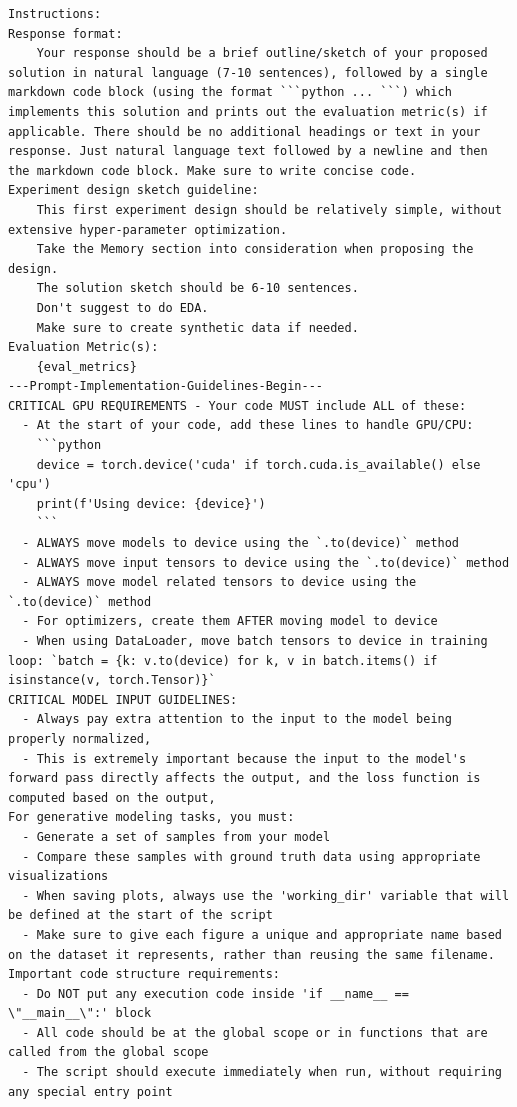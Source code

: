 \begin{appendices}
\begin{tcolorbox}[breakable, colback=orange!5!white, colframe=orange!80!black, title=Initial Experiment Implementation Prompt]
\begin{Verbatim}[breaklines, breaksymbol={}, breaksymbolleft={}, fontsize=\small]
Instructions:
Response format:
    Your response should be a brief outline/sketch of your proposed solution in natural language (7-10 sentences), followed by a single markdown code block (using the format ```python ... ```) which implements this solution and prints out the evaluation metric(s) if applicable. There should be no additional headings or text in your response. Just natural language text followed by a newline and then the markdown code block. Make sure to write concise code.
Experiment design sketch guideline:
    This first experiment design should be relatively simple, without extensive hyper-parameter optimization.
    Take the Memory section into consideration when proposing the design.
    The solution sketch should be 6-10 sentences.
    Don't suggest to do EDA.
    Make sure to create synthetic data if needed.
Evaluation Metric(s):
    {eval_metrics}
---Prompt-Implementation-Guidelines-Begin---
CRITICAL GPU REQUIREMENTS - Your code MUST include ALL of these:
  - At the start of your code, add these lines to handle GPU/CPU:
    ```python
    device = torch.device('cuda' if torch.cuda.is_available() else 'cpu')
    print(f'Using device: {device}')
    ```
  - ALWAYS move models to device using the `.to(device)` method
  - ALWAYS move input tensors to device using the `.to(device)` method
  - ALWAYS move model related tensors to device using the `.to(device)` method
  - For optimizers, create them AFTER moving model to device
  - When using DataLoader, move batch tensors to device in training loop: `batch = {k: v.to(device) for k, v in batch.items() if isinstance(v, torch.Tensor)}`
CRITICAL MODEL INPUT GUIDELINES:
  - Always pay extra attention to the input to the model being properly normalized,
  - This is extremely important because the input to the model's forward pass directly affects the output, and the loss function is computed based on the output,
For generative modeling tasks, you must:
  - Generate a set of samples from your model
  - Compare these samples with ground truth data using appropriate visualizations
  - When saving plots, always use the 'working_dir' variable that will be defined at the start of the script
  - Make sure to give each figure a unique and appropriate name based on the dataset it represents, rather than reusing the same filename.
Important code structure requirements:
  - Do NOT put any execution code inside 'if __name__ == \"__main__\":' block
  - All code should be at the global scope or in functions that are called from the global scope
  - The script should execute immediately when run, without requiring any special entry point

\end{Verbatim}
\end{tcolorbox}
\end{appendices}

